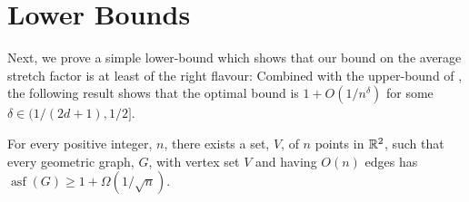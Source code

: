 \documentclass{patmorin}
\DeclareMathOperator{\asf}{asf}
\begin{document}
\section{Lower Bounds}

Next, we prove a simple lower-bound which shows that our bound on the
average stretch factor is at least of the right flavour: Combined with
the upper-bound of , the following result shows that
the optimal bound is $1+O(1/n^{\delta})$ for some $\delta\in(1/(2d+1),1/2]$.

\begin{thm}
  For every positive integer, $n$, there exists a set, $V$, of $n$
  points in $\mathbb{R}^2$, such that every geometric graph, $G$, with vertex
  set $V$ and having $O(n)$ edges has $\asf(G)\ge 1 + \Omega(1/\sqrt{n})$.
\end{thm}
\end{document}
